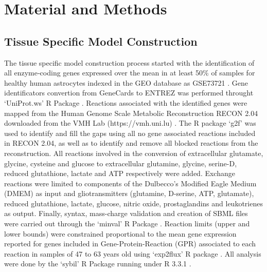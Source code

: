\section{Material and Methods}
\subsection*{Tissue Specific Model Construction}
The tissue specific model construction process started with the identification of all enzyme‐coding genes expressed over the mean in at least 50\% of samples for healthy human astrocytes indexed in the GEO database \cite{Edgar2002} as GSE73721 \citep{Zhang2016}. Gene identificators convertion from GeneCards\cite{rebhan1997genecards} to ENTREZ \cite{maglott2005entrez} was performed throught `UniProt.ws' R Package \cite{Carlson2016}. Reactions associated with the identified genes were mapped from the Human Genome Scale  Metabolic Reconstruction RECON 2.04 downloaded from the VMH Lab (https://vmh.uni.lu) \cite{thiele2013community}. The R package `g2f' \cite{G2F} was used to identify and fill the gaps using all no gene associated reactions included in RECON 2.04, as well as to identify and remove all blocked reactions  from the reconstruction. All reactions involved in the conversion of extracellular glutamate, glycine, cysteine and glucose to extracellular glutamine, glycine, serine-D, reduced glutathione, lactate and ATP respectively were added. Exchange reactions were limited to components of the Dulbecco's Modified Eagle Medium (DMEM) as input and gliotransmitters (glutamine, D-serine, ATP, glutamate), reduced glutathione, lactate, glucose, nitric oxide, prostaglandins and leukotrienes as output. Finally, syntax, mass-charge validation and creation of SBML files were carried out through the `minval' R Package \cite{MINVAL}. Reaction limits (upper and lower bounds) were constrained proportional to the mean gene expression reported for genes included in Gene-Protein-Reaction (GPR) \cite{Thiele2010} associated to each reaction in samples of 47 to 63 years old using `exp2flux' R package \cite{EXP2FLUX}. All analysis were done by the `sybil' \cite{Gelius-Dietrich2013} R Package running under R 3.3.1 \cite{RCoreTeam2016}.
